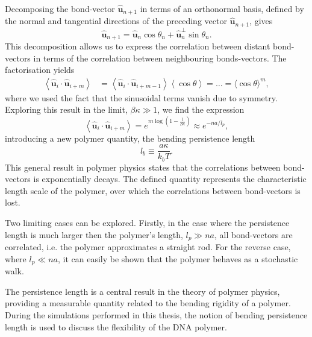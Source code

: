 Decomposing the bond-vector $\boldsymbol{\hat{u}}_{n+1}$ in terms of an orthonormal
basis, defined by the normal and tangential directions of the preceding vector
$\boldsymbol{\hat{u}}_{n+1}$, gives
\begin{equation}
\boldsymbol{\hat{u}}_{n+1} = \boldsymbol{\hat{u}}_{n} \cos \theta_{n} +
\boldsymbol{\hat{u}}_{n}^{\perp} \sin \theta_{n}.
\end{equation}
This decomposition allows us to express the correlation between distant bond-vectors in
terms of the correlation between neighbouring bonds-vectors. The factorisation
yields
\begin{equation}
\begin{aligned}
    \left\langle\boldsymbol{\hat{u}}_{i} \cdot \boldsymbol{\hat{u}}_{i+m}\right\rangle
    &=\left\langle\boldsymbol{\hat{u}}_{i} \cdot
        \boldsymbol{\hat{u}}_{i+m-1}\right\rangle\left\langle\cos
    \theta\right\rangle = \dots =\langle\cos \theta\rangle^{m},
\end{aligned}
\end{equation}
where we used the fact that the sinusoidal terms vanish due to symmetry.
Exploring this result in the limit, $\beta \kappa \gg 1$, we find the expression
\begin{equation}
    \left\langle\boldsymbol{\hat{u}}_{i} \cdot \boldsymbol{\hat{u}}_{i+m}\right\rangle =
    e^{m \log(1 - \frac{1}{\beta \kappa})} \approx e^{-na/l_p},
\end{equation}
introducing a new polymer quantity, the bending persistence length
\begin{equation}
    l_b \equiv \frac{a \kappa}{k_{b} T}.
    \label{eq:persistance}
\end{equation}
This general result in polymer physics states that the correlations between bond-vectors
is exponentially decays. The defined quantity represents the characteristic
length scale of the polymer, over which the correlations between
bond-vectors is lost.

Two limiting cases can be explored. Firstly, in the
case where the persistence length is much larger then the polymer's length, $l_p \gg na$,
all bond-vectors are correlated, i.e. the polymer approximates a straight rod. For the
reverse case, where $l_p \ll na$, it can easily be shown that the polymer behaves as a
stochastic walk.

The persistence length is a central result in the theory of polymer physics, providing a
measurable quantity related to the bending rigidity of a polymer. During the
simulations performed in this thesis, the notion of bending persistence length is used to
discuss the flexibility of the DNA polymer.

